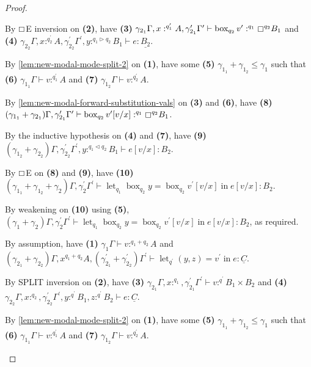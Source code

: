 \documentclass[acmsmall,screen,nonacm]{acmart}
\DeclareMathOperator{\llet}{\text{let}}
\DeclareMathOperator{\lin}{\text{in}}
\DeclareMathOperator{\bbox}{\text{box}}
\newcommand{\tee}{\vdash}
\DeclareMathOperator{\scale}{\mathbin{\triangleleft}}
\DeclareMathOperator{\boxop}{\mathbin{\triangleright}}
\begin{document}
\begin{proof}
\begin{description}
    By $\boxempty$E inversion on \textbf{(2)}, have \textbf{(3)} $\gamma_{2_1}\Gamma, x :^{q_1^\prime} A, \gamma_{2_1}^\prime\Gamma^\prime \tee \bbox_{q_2} v^\prime :^{q_1} \boxempty^{q_2} B_1$ and \textbf{(4)} $\gamma_{2_2}\Gamma, x :^{q_2^\prime} A, \gamma_{2_2}^\prime\Gamma^\prime, y :^{q_1 \boxop q_2} B_1 \tee e : \underline{B_2}$.

    By \ref{lem:new-modal-mode-split-2} on \textbf{(1)}, have some \textbf{(5)} $\gamma_{1_1} + \gamma_{1_2} \le \gamma_1$ such that \textbf{(6)} $\gamma_{1_1}\Gamma \tee v :^{q_1^\prime} A$ and \textbf{(7)} $\gamma_{1_2}\Gamma \tee v :^{q_2^\prime} A$.

    By \ref{lem:new-modal-forward-substitution-vals} on \textbf{(3)} and \textbf{(6)}, have \textbf{(8)} $(\gamma_{1_1} + \gamma_{2_1})\Gamma, \gamma_{2_1}^\prime\Gamma^\prime \tee \bbox_{q_2} v^\prime[v/x] :^{q_1} \boxempty^{q_2} B_1$. 

    By the inductive hypothesis on \textbf{(4)} and \textbf{(7)}, have \textbf{(9)} $(\gamma_{1_2} + \gamma_{2_2})\Gamma, \gamma_{2_2}^\prime\Gamma^\prime, y :^{q_1 \scale q_2} B_1 \tee e[v/x] : B_2$.

    By $\boxempty$E on \textbf{(8)} and \textbf{(9)}, have \textbf{(10)} $(\gamma_{1_1} + \gamma_{1_2} + \gamma_2)\Gamma, \gamma_2^\prime\Gamma^\prime \tee \llet_{q_1} \bbox_{q_2} y = \bbox_{q_2} v^\prime[v/x] \lin e[v/x] : B_2$.

    By weakening on \textbf{(10)} using \textbf{(5)}, $(\gamma_1 + \gamma_2)\Gamma, \gamma_2^\prime\Gamma^\prime \tee \llet_{q_1} \bbox_{q_2} y = \bbox_{q_2} v^\prime[v/x] \lin e[v/x] : B_2$, as required.
    \\
    \item[Case SPLIT.]
    By assumption, have \textbf{(1)} $\gamma_1\Gamma \tee v :^{q_1 + q_2} A$ and $(\gamma_{2_1} + \gamma_{2_2})\Gamma, x^{q_1 + q_2} A, (\gamma_{2_1}^\prime + \gamma_{2_2}^\prime)\Gamma^\prime \tee \llet_{q^\prime} (y, z) = v^\prime \lin e : \underline{C}$.

    By SPLIT inversion on \textbf{(2)}, have \textbf{(3)} $\gamma_{2_1}\Gamma, x :^{q_1}, \gamma_{2_1}^\prime\Gamma^\prime \tee v :^{q^\prime} B_1 \times B_2$ and \textbf{(4)} $\gamma_{2_2}\Gamma, x :^{q_2}, \gamma_{2_2}^\prime\Gamma^\prime, y :^{q^\prime} B_1, z :^{q^\prime} B_2 \tee e : \underline{C}$.

    By \ref{lem:new-modal-mode-split-2} on \textbf{(1)}, have some \textbf{(5)} $\gamma_{1_1} + \gamma_{1_2} \le \gamma_1$ such that \textbf{(6)} $\gamma_{1_1}\Gamma \tee v :^{q_1^\prime} A$ and \textbf{(7)} $\gamma_{1_2}\Gamma \tee v :^{q_2^\prime} A$.
    

\end{description}
\end{proof}
\end{document}
